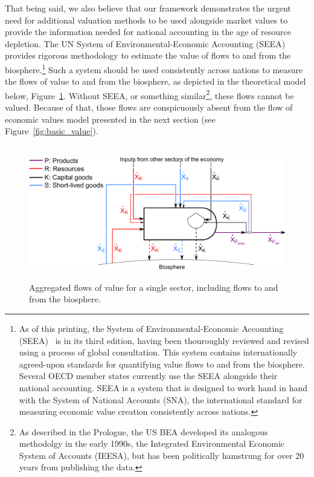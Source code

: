 That being said, we also believe that our framework demonstrates the  
urgent need for additional valuation methods to be used
alongside market values to provide the information
needed for national accounting in the age of resource depletion. 
The UN System of Environmental-Economic Accounting (SEEA)
provides rigorous methodology to estimate the value 
of flows to and from the biosphere.\footnote{As of this printing, 
	the System of Environmental-Economic Accounting (SEEA)~\cite{UNSEEA2014}
	is in its third edition, having been thouroughly reviewed and revised 
	using a process of global consultation. 
	This system contains internationally agreed-upon standards for quantifying value flows 
	to and from the biosphere. Several OECD member states
	currently use the SEEA alongside their national
	accounting.
	SEEA is a system that is designed to 
	work hand in hand with the System of National Accounts (SNA), 
	the international standard for measuring economic value creation consistently across nations.} 
Such a system should be used consistently across
nations to measure the flows of value
to and from the biosphere, as depicted  in the theoretical model below, Figure~\ref{fig:basic_value_with_biosphere_flows}.
Without SEEA, or something similar\footnote{As 
described in the Prologue, the US BEA developed
its analogous methodolgy
in the early 1990s, the Integrated Environmental
Economic System of Accounts (IEESA), but has been politically hamstrung for
over 20 years from publishing the data.}, 
these flows cannot be valued. Because
of that, those flows are conspicuously 
absent from the flow of economic values model presented  in the next section (see Figure~\ref{fig:basic_value}).

\begin{figure}[ht!]
\centering\
\includegraphics[width=0.8\linewidth]{Part_2/Chapter_Values/images/PERKS_basic_unit_value_with_biosphere_flows.pdf}
\caption[Aggregated flows of value for a single sector including flows to and from the biosphere]{Aggregated flows of value for a single sector, including flows to and from the biosphere.}
\label{fig:basic_value_with_biosphere_flows}
\end{figure}

